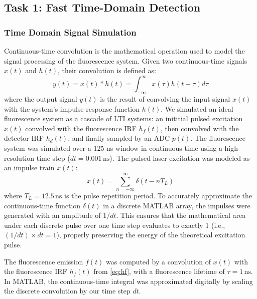 \documentclass[conference]{IEEEtran}
\begin{document}
\subsection{Task 1: Fast Time-Domain Detection}
\subsubsection{Time Domain Signal Simulation}

Continuous-time convolution is the mathematical operation used to model the signal processing of the fluorescence system. 
Given two continuous-time signals $x(t)$ and $h(t)$, their convolution is defined as:
\begin{equation}
    y(t) = x(t) * h(t) = \int_{-\infty}^{\infty} x(\tau) h(t - \tau) d\tau
\end{equation}
where the output signal $y(t)$ is the result of convolving the input signal $x(t)$ with the system's impulse response function $h(t)$.
We simulated an ideal fluorescence system as a cascade of LTI systems: an inititial pulsed excitation $x(t)$ convolved with the fluorescence IRF $h_f(t)$,
then convolved with the detector IRF $h_d(t)$, and finally sampled by an ADC $p(t)$.
The fluorescence system was simulated over a 125 ns window in continuous time using a high-resolution time step ($dt = 0.001\,\text{ns}$). 
The pulsed laser excitation was modeled as an impulse train $x(t)$:
\begin{equation}
    x(t) = \sum_{n=-\infty}^{\infty} \delta(t - nT_L)
    \label{eq:xl}
\end{equation}
where $T_L = 12.5\,\text{ns}$ is the pulse repetition period. 
To accurately approximate the continuous-time function $\delta(t)$ in a discrete MATLAB array, the impulses were generated with an amplitude of $1/dt$.
This ensures that the mathematical area under each discrete pulse over one time step evaluates to exactly 1 (i.e., $(1/dt) \times dt = 1$), properly preserving the energy of the theoretical excitation pulse. 

The fluorescence emission $f(t)$ was computed by a convolution of $x(t)$ with the fluorescence IRF $h_f(t)$ from \eqref{eq:hf},
with a fluorescence lifetime of $\tau = 1\,\text{ns}$. In MATLAB, the continuous-time integral was approximated digitally by scaling the discrete convolution by our time step $dt$.
\end{document}
